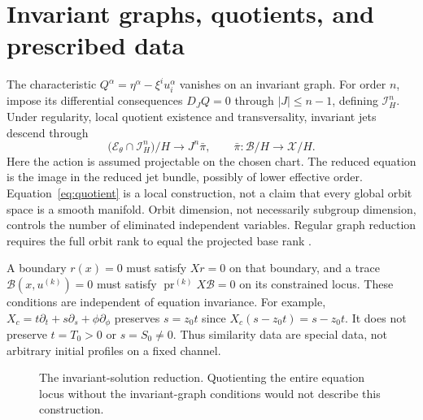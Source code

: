 \documentclass[11pt,a4paper,oneside]{report}
\numberwithin{equation}{chapter}
\newcommand{\E}{\mathcal E}
\newcommand{\pr}{\operatorname{pr}}
\begin{document}
\section{Invariant graphs, quotients, and prescribed data}
The characteristic $Q^\alpha=\eta^\alpha-\xi^iu_i^\alpha$ vanishes on an invariant graph. For order $n$, impose its differential consequences $D_JQ=0$ through $|J|\le n-1$, defining $\mathcal I_H^n$. Under regularity, local quotient existence and transversality, invariant jets descend through
\begin{equation}\label{eq:quotient}
\bigl(\E_\theta\cap\mathcal I_H^n\bigr)/H
\longrightarrow J^n\bar\pi,\qquad
\bar\pi:\mathcal B/H\longrightarrow\mathcal X/H.
\end{equation}
Here the action is assumed projectable on the chosen chart. The reduced equation is the image in the reduced jet bundle, possibly of lower effective order. Equation~\eqref{eq:quotient} is a local construction, not a claim that every global orbit space is a smooth manifold. Orbit dimension, not necessarily subgroup dimension, controls the number of eliminated independent variables. Regular graph reduction requires the full orbit rank to equal the projected base rank \cite{olver1986,anderson2000}.



A boundary $r(x)=0$ must satisfy $Xr=0$ on that boundary, and a trace $\mathcal B(x,u^{(k)})=0$ must satisfy $\pr^{(k)}X\mathcal B=0$ on its constrained locus. These conditions are independent of equation invariance. For example, $X_c=t\partial_t+s\partial_s+\phi\partial_\phi$ preserves $s=z_0t$ since $X_c(s-z_0t)=s-z_0t$. It does not preserve $t=T_0>0$ or $s=S_0\ne0$. Thus similarity data are special data, not arbitrary initial profiles on a fixed channel.
\begin{figure}[H]\centering
{}
\caption{The invariant-solution reduction. Quotienting the entire equation locus without the invariant-graph conditions would not describe this construction.}\label{fig:quotient}
\end{figure}
\end{document}
